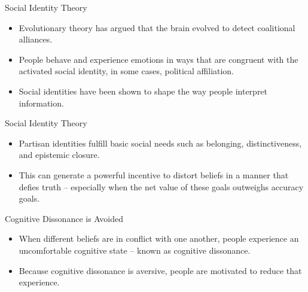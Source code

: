 \documentclass[nobackground,dvipsnames,table]{beamer}
\begin{document}
\begin{frame}{Social Identity Theory}

\begin{itemize}
    \item Evolutionary theory has argued that the brain evolved to detect coalitional alliances.
    \item People behave and experience emotions in ways that are congruent with the activated social identity, in some cases, political affiliation.
    \item Social identities have been shown to shape the way people interpret information.
\end{itemize}
\end{frame}


\begin{frame}{Social Identity Theory}

\begin{itemize}
    \item Partisan identities fulfill basic social needs such as belonging, distinctiveness, and epistemic closure.
    \item This can generate a powerful incentive to distort beliefs in a manner that defies truth – especially when the net value of these goals outweighs accuracy goals.

\end{itemize}
\end{frame}


\begin{frame}{Cognitive Dissonance is Avoided}

\begin{itemize}
    \item When different beliefs are in conflict with one another, people experience an uncomfortable cognitive state – known as cognitive dissonance.
    \item Because cognitive dissonance is aversive, people are motivated to reduce that experience.
\end{itemize}
\end{frame}
\end{document}
